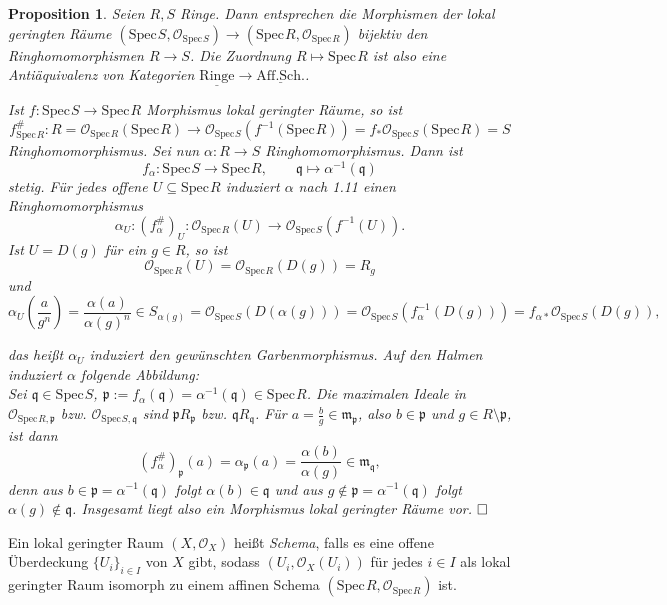 \documentclass[11pt]{book}
\newtheorem{proposition}[theorem]{Proposition}
\theoremstyle{nonumberbreak}
\newenvironment{defin}[1][]{\ifthenelse{\equal{#1}{}}{\definition}{\definition[#1]}\rm}{\enddefinition}
\newenvironment{pr}[1][]{\ifthenelse{\equal{#1}{}}{\proof}{\proof[#1]}\rm}{\endproof}
\newcommand{\spec}{\mathrm{Spec} \hspace{1pt} }
\newcommand{\p}{\mathfrak{p}}
\newcommand{\q}{\mathfrak{q}}
\newcommand{\ringe}{\underline{\mathrm{Ringe}}}
\newcommand{\affsch}{\underline{\mathrm{Aff. Sch.}}}
\begin{document}
\begin{spacing}{1.4}
\begin{proposition} %
Seien $R,S$ Ringe. Dann entsprechen die Morphismen der lokal geringten Räume $\left(\spec S, \mathcal{O}_{\spec S}\right) \longrightarrow \left( \spec R, \mathcal{O}_{\spec R}\right)$ bijektiv den Ringhomomorphismen $R \longrightarrow S$. Die Zuordnung $R \mapsto \spec R$ ist also eine \textit{Antiäquivalenz} von Kategorien $\ringe \longrightarrow \affsch$.

\begin{pr}
Ist $f: \spec S \longrightarrow \spec R$ Morphismus lokal geringter Räume, so ist 
$$f^\#_{\spec R}: R=\mathcal{O}_{\spec R}\left( \spec R\right) \longrightarrow \mathcal{O}_{\spec S} \left( f^{-1}(\spec R) \right) = f_{*} \mathcal{O}_{\spec S} \left( \spec R \right)  = S$$
Ringhomomorphismus. Sei nun $\alpha: R \longrightarrow S$ Ringhomomorphismus. Dann ist 
$$f_{\alpha}: \spec S \longrightarrow \spec R, \qquad \q \mapsto \alpha^{-1}(\q)$$
stetig. Für jedes offene $U \subseteq \spec R$ induziert $\alpha$ nach 1.11 einen Ringhomomorphismus
$$\alpha_U: \left(f^\#_{\alpha}\right)_U: \mathcal{O}_{\spec R}(U) \longrightarrow \mathcal{O}_{\spec S}\left(f^{-1}(U)\right).$$
Ist $U = D(g)$ für ein $g \in R$, so ist 
$$\mathcal{O}_{\spec R}(U) = \mathcal{O}_{\spec R}\left(D(g)\right) = R_g$$
und 
$$\alpha_U\left(\frac{a}{g^n}\right) = \frac{\alpha(a)}{\alpha(g)^n} \in S_{\alpha(g)} = \mathcal{O}_{\spec S}\left(D(\alpha(g))\right) = \mathcal{O}_{\spec S} \left( f_{\alpha}^{-1}(D(g))\right) = f_{\alpha *} \mathcal{O}_{\spec S}\left(D(g)\right),$$

das heißt $\alpha_U$ induziert den gewünschten Garbenmorphismus. Auf den Halmen induziert $\alpha$ folgende Abbildung:\\
Sei $\q \in \spec S$, $\p:= f_{\alpha}(\q) = \alpha^{-1}(\q) \in \spec R$. Die maximalen Ideale in $\mathcal{O}_{\spec R, \p}$ bzw. $\mathcal{O}_{\spec S, \q}$ sind $\p R_{\p}$ bzw. $\q R_{\q}$. Für $a= \frac{b}{g} \in \mathfrak{m}_{\p}$, also $b \in \p$ und $g \in R \setminus \p$, ist dann 
$$\left(f_{\alpha}^\#\right)_{\p} (a) = \alpha_{\p} (a) =\frac{\alpha(b)}{\alpha(g)} \in \mathfrak{m}_{\q},$$
denn aus $b \in \p= \alpha^{-1}(\q)$ folgt $\alpha(b) \in \q$ und aus $g \notin \p= \alpha^{-1}(\q)$ folgt $\alpha(g) \notin \q$. Insgesamt liegt also ein Morphismus lokal geringter Räume vor. $\hfill \Box$
\end{pr}
\end{proposition}


\begin{defin} %
Ein lokal geringter Raum $(X, \mathcal{O}_X)$ heißt \textit{Schema}, falls es eine offene Überdeckung $\{U_i\}_{i \in I}$ von $X$ gibt, sodass $(U_i, \mathcal{O}_X(U_i))$ für jedes $i \in I$ als lokal geringter Raum isomorph zu einem affinen Schema $\left(\spec R, \mathcal{O}_{\spec R}\right)$ ist.
\end{defin}


\end{spacing}
\end{document}
